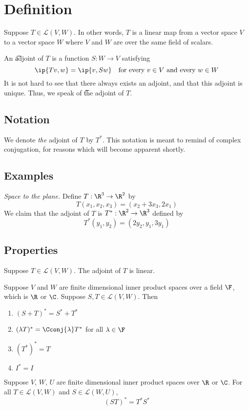 
\section*{Definition}

Suppose $T \in \mathcal{L} (V, W)$.
In other words, $T$ is a linear map from a vector space $V$ to a vector space $W$ where $V$ and $W$ are over the same field of scalars.

An \t{adjoint} of $T$ is a function $S: W \to V$ satisfying
\[
\ip{Tv, w} = \ip{v, Sw} \quad \text{for every } v \in V \text{ and every } w \in W
\]
It is not hard to see that there always exists an adjoint, and that this adjoint is unique.
Thus, we speak of \t{the adjoint} of $T$.

\subsection*{Notation}

We denote \textit{the} adjoint of $T$ by $T^*$.
This notation is meant to remind of complex conjugation, for reasons which will become apparent shortly.

\subsection*{Examples}

\textit{Space to the plane.}
Define $T: \R ^3 \to \R ^2$ by
\[
T(x_1, x_2, x_3) = (x_2 + 3x_3, 2x_1)
\]
We claim that the adjoint of $T$ is $T^*: \R ^2 \to \R ^3$ defined by
\[
T^*(y_1, y_2) = (2y_2, y_1, 3y_1)
\]


\subsection*{Properties}

\begin{proposition}
Suppose $T \in \mathcal{L} (V, W)$.
The adjoint of $T$ is linear.
\end{proposition}

\begin{proposition}
Suppose $V$ and $W$ are finite dimensional inner product spaces over a field $\F $, which is $\R $ or $\C $.
Suppose $S, T \in \mathcal{L} (V, W)$.
Then
  \begin{enumerate}
    \item $(S + T)^* = S^* + T^*$
    \item $(\lambda T)^* = \Cconj{\lambda }T^*$ for all $\lambda \in \F $
    \item $ (T^*)^* = T$
    \item $ I^* = I$
  \end{enumerate}
\end{proposition}

\begin{proposition}
Suppose $V$, $W$, $U$ are finite dimensional inner product spaces over $\R $ or $\C $.
For all $T \in \mathcal{L} (V, W)$ and $S \in \mathcal{L} (W, U)$,
\[
(ST)^* = T^*S^*
\]
\end{proposition}

\blankpage